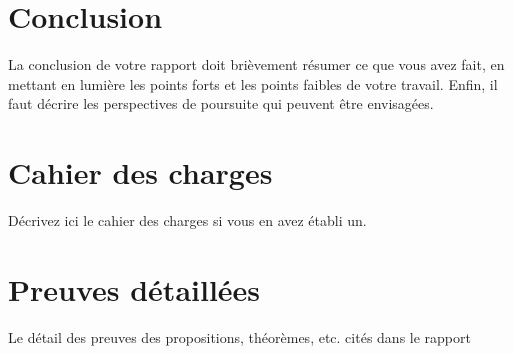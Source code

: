 \documentclass[a4paper, 12pt]{report}
\begin{document}
    
\chapter{Conclusion}
La conclusion de votre rapport doit brièvement résumer ce que vous avez fait, en mettant en lumière les points forts et les points faibles de votre travail. Enfin, il faut décrire les perspectives de poursuite qui peuvent être envisagées.

    
    
    \printbibliography
 
 
 

    \appendix

    \chapter{Cahier des charges}
    Décrivez ici le cahier des charges si vous en avez établi un. 
    
     \chapter{Preuves détaillées }
	Le détail des preuves des propositions, théorèmes, etc. cités dans le rapport 
\end{document}
